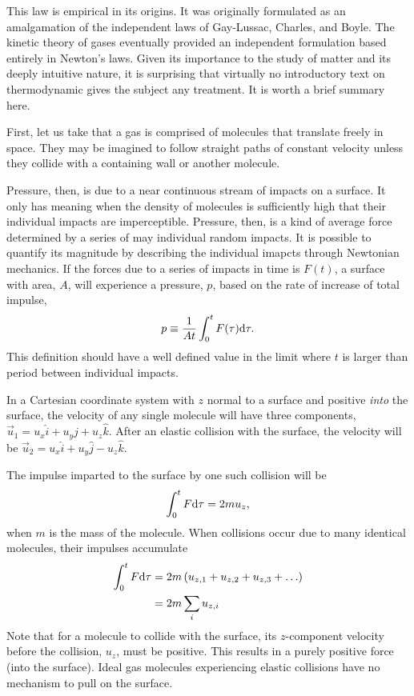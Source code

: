 This law is empirical in its origins.  It was originally formulated as an amalgamation of the independent laws of Gay-Lussac, Charles, and Boyle.  The kinetic theory of gases eventually provided an independent formulation based entirely in Newton's laws.  Given its importance to the study of matter and its deeply intuitive nature, it is surprising that virtually no introductory text on thermodynamic gives the subject any treatment.  It is worth a brief summary here.

First, let us take that a gas is comprised of molecules that translate freely in space.  They may be imagined to follow straight paths of constant velocity unless they collide with a containing wall or another molecule.  

Pressure, then, is due to a near continuous stream of impacts on a surface.  It only has meaning when the density of molecules is sufficiently high that their individual impacts are imperceptible.  Pressure, then, is a kind of average force determined by a series of may individual random impacts.  It is possible to quantify its magnitude by describing the individual imapcts through Newtonian mechanics.  If the forces due to a series of impacts in time is $F(t)$, a surface with area, $A$, will experience a pressure, $p$, based on the rate of increase of total impulse,
\begin{align}
p \equiv \frac{1}{A t} \int_0^t F(\tau) \mathrm{d} \tau.
\end{align}
This definition should have a well defined value in the limit where $t$ is larger than period between individual impacts.

In a Cartesian coordinate system with $z$ normal to a surface and positive \emph{into} the surface, the velocity of any single molecule will have three components, $\vec{u}_1 = u_x \hat{i} + u_y \hat{j} + u_z \hat{k}$.  After an elastic collision with the surface, the velocity will be $\vec{u}_2 = u_x \hat{i} + u_y \hat{j} - u_z \hat{k}$.

The impulse imparted to the surface by one such collision will be
\begin{align}
\int_0^t F \mathrm{d} \tau = 2 m u_z,
\end{align}
when $m$ is the mass of the molecule.  When collisions occur due to many identical molecules, their impulses accumulate
\begin{align}
\int_0^t F \mathrm{d} \tau &= 2 m \left( u_{z,1} + u_{z,2} + u_{z,3} + \ldots \right)\nonumber\\
  &= 2 m \sum_i u_{z,i}
\end{align}
Note that for a molecule to collide with the surface, its $z$-component velocity before the collision, $u_z$, must be positive.  This results in a purely positive force (into the surface).  Ideal gas molecules experiencing elastic collisions have no mechanism to pull on the surface.

